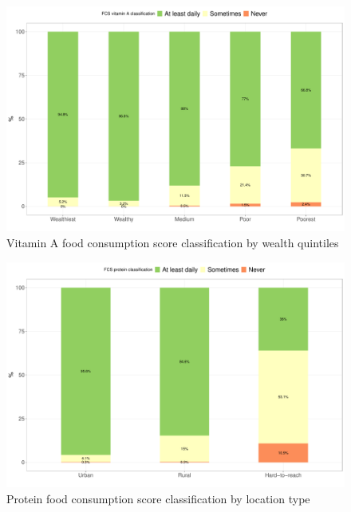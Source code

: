 \documentclass[12pt,a4paper]{article}
\begin{document}
\begin{figure}[H]

{\centering \includegraphics{kayahReport_files/figure-latex/fcsn2plot-1} 

}

\caption{Vitamin A food consumption score classification by wealth quintiles}\label{fig:fcsn2plot}
\end{figure}

\begin{figure}[H]

{\centering \includegraphics{kayahReport_files/figure-latex/fcsn3plot-1} 

}

\caption{Protein food consumption score classification by location type}\label{fig:fcsn3plot}
\end{figure}
\end{document}
